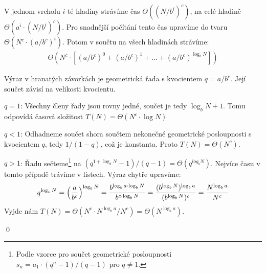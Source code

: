V jednom vrcholu $i$-té hladiny strávíme čas $\Theta((N/b^i)^c)$, na celé
hladině $\Theta(a^i\cdot (N/b^i)^c)$. Pro snadnější počítání tento čas upravíme do
tvaru $\Theta(N^c\cdot (a/b^c)^i)$. Potom v součtu na všech hladinách strávíme:
\begin{align*}
\Theta(N^c\cdot [(a/b^c)^0 + (a/b^c)^1 + \dots + (a/b^c)^{\log_b N} ])
\end{align*}

Výraz v hranatých závorkách je geometrická řada s kvocientem $q=a/b^c$. Její součet závisí na velikosti kvocientu.
\begin{itemize*}
\item $q = 1$: Všechny členy řady jsou rovny jedné, součet je tedy $\log_b N +
	1$. Tomu odpovídá časová složitost $T(N) = \Theta(N^c \cdot \log N)$
\item $q < 1$: Odhadneme součet shora součtem nekonečné geometrické
	posloupnosti s kvocientem $q$, tedy $1/(1-q)$, což je konstanta. Proto
	$T(N) = \Theta(N^c)$.
\item $q > 1$: Řadu sečteme\footnote{Podle vzorce pro součet geometrické posloupnosti $s_n = a_1\cdot(q^n-1)/(q-1)$ pro $q\neq 1$.} na $(q^{1+\log_b N} - 1) / (q-1) = \Theta(q^{log_b N})$. Nejvíce času v tomto případě trávíme v listech. Výraz chytře upravíme:
\begin{align*}
q^{\log_b N} = \left(a\over b^c\right)^{\log_b N} = {b^{\log_b a\cdot\log_b N} \over b^{c\cdot\log_b N}} = {(b^{\log_b N})^{\log_b a} \over (b^{\log_b N})^c} = {N^{\log_b a}\over N^c}
\end{align*}
Vyjde nám $T(N) = \Theta(N^c\cdot N^{\log_b a} / N^c) = \Theta(N^{\log_b a})$.
\end{itemize*}
\qed

